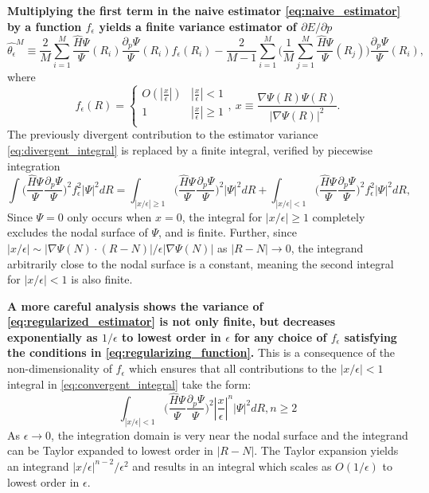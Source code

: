 \documentclass{article}
\begin{document}
\textbf{Multiplying the first term in the naive estimator \eqref{eq:naive_estimator} by a function $f_\epsilon$ yields a finite variance estimator of $\partial E/\partial p$}
\begin{equation}
\hat{\theta_\epsilon}^M \equiv \frac{2}{M}\sum_{i=1}^M \frac{\hat{H}\Psi}{\Psi}(R_i)\frac{\partial_p \Psi}{\Psi}(R_i) f_\epsilon(R_i) - \frac{2}{M-1} \sum_{i=1}^M \Big(\frac{1}{M} \sum_{j=1}^M \frac{\hat{H}\Psi}{\Psi}(R_j)\Big)\frac{\partial_p \Psi}{\Psi}(R_i), \label{eq:regularized_estimator}
\end{equation}
where 
\begin{equation}
f_\epsilon(R) = \begin{cases} 
      O(|\frac{x}{\epsilon}|) & |\frac{x}{\epsilon}| < 1 \\
      1 & |\frac{x}{\epsilon}| \ge 1 \\
   \end{cases},\ x \equiv \frac{\nabla \Psi(R) \Psi(R)}{|\nabla \Psi(R)|^2}.
\label{eq:regularizing_function}
\end{equation} 
The previously divergent contribution to the estimator variance \eqref{eq:divergent_integral} is replaced by a finite integral, verified by piecewise integration
\begin{equation}
\int \Big(\frac{\hat{H}\Psi}{\Psi}\frac{\partial_p\Psi}{\Psi}\Big)^2 f_\epsilon^2 |\Psi|^2 dR =\int_{|x/\epsilon|\geq 1} \Big(\frac{\hat{H}\Psi}{\Psi}\frac{\partial_p\Psi}{\Psi}\Big)^2 |\Psi|^2 dR + \int_{|x/\epsilon|< 1} \Big(\frac{\hat{H}\Psi}{\Psi}\frac{\partial_p\Psi}{\Psi}\Big)^2 f_\epsilon^2 |\Psi|^2 dR,
\label{eq:convergent_integral}
\end{equation}
Since $\Psi = 0$ only occurs when $x = 0$, the integral for $|x/\epsilon|\geq 1$ completely excludes the nodal surface of $\Psi$, and is finite. 
Further, since $|x/\epsilon| \sim |\nabla\Psi(N) \cdot (R-N)|/\epsilon|\nabla  \Psi(N)|$ as $|R - N| \rightarrow 0$, the integrand arbitrarily close to the nodal surface is a constant, meaning the second integral for $|x/\epsilon| < 1$ is also finite.

\textbf{A more careful analysis shows the variance of \eqref{eq:regularized_estimator} is not only finite, but decreases exponentially as $1/\epsilon$ to lowest order in $\epsilon$ for any choice of $f_\epsilon$ satisfying the conditions in \eqref{eq:regularizing_function}.}
This is a consequence of the non-dimensionality of $f_\epsilon$ which ensures that all contributions to the $|x/\epsilon|< 1$ integral in \eqref{eq:convergent_integral} take the form:
\begin{equation}
\int_{|x/\epsilon|< 1} \Big(\frac{\hat{H}\Psi}{\Psi}\frac{\partial_p\Psi}{\Psi}\Big)^2 |\frac{x}{\epsilon}|^n |\Psi|^2 dR, n\geq 2
\end{equation}
As $\epsilon \rightarrow 0$, the integration domain is very near the nodal surface and the integrand can be Taylor expanded to lowest order in $|R-N|$. 
The Taylor expansion yields an integrand $|x/\epsilon|^{n-2}/\epsilon^2$ and results in an integral which scales as $O(1/\epsilon)$ to lowest order in $\epsilon$.
\end{document}
